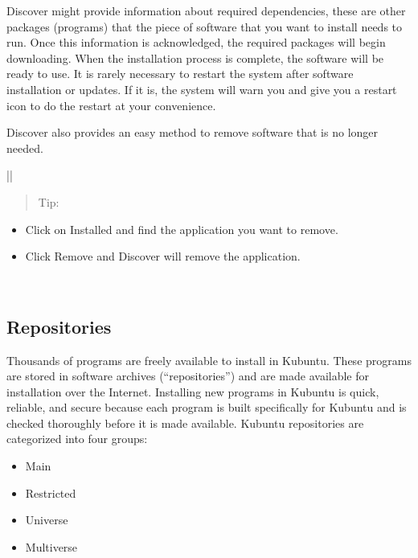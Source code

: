 \documentclass[letterpaper,10pt,english]{sphinxmanual}
\begin{document}
\noindent{}

Discover might provide information about required dependencies, these are other packages (programs) that the piece of software that you want to install needs to run. Once this information is acknowledged, the required packages will begin downloading. When the installation process is complete, the software will be ready to use. It is rarely necessary to restart the system after software installation or updates. If it is, the system will warn you and give you a restart icon to do the restart at your convenience.

Discover also provides an easy method to remove software that is no longer needed.


\begin{savenotes}\sphinxattablestart
\centering
\begin{tabular}[t]{|*{1}{|}}
\hline
\begin{quote}

Tip:
\end{quote}
\begin{itemize}
\item {} 
Click on Installed and find the application you want to remove.

\item {} 
Click Remove and Discover will remove the application.

\end{itemize}
\\
\hline
\end{tabular}
\par
\sphinxattableend\end{savenotes}


\subsection{Repositories}
\label{\detokenize{docs/advanced:repositories}}
Thousands of programs are freely available to install in Kubuntu. These programs are stored in software archives (“repositories”) and are made available for installation over the Internet. Installing new programs in Kubuntu is quick, reliable, and secure because each program is built specifically for Kubuntu and is checked thoroughly before it is made available. Kubuntu repositories are categorized into four groups:
\begin{itemize}
\item {} 
Main

\item {} 
Restricted

\item {} 
Universe

\item {} 
Multiverse

\end{itemize}
\end{document}
